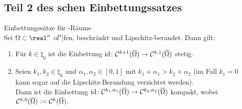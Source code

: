 \subsection{%
    Teil 2 des schen Einbettungssatzes%
}

\begin{Lemma}{Einbettungssätze für -Räume}\\
    Sei $\Omega \subset \real^n$ of"|fen, beschränkt und Lipschitz-berandet.
    Dann gilt:
    \begin{enumerate}
        \item
        Für $k \in \natural_0$ ist die Einbettung
        $\text{id}\colon \mathcal{C}^{k+1}(\overline{\Omega}) \to \mathcal{C}^{k,1}(\overline{\Omega})$ stetig.
        
        \item
        Seien $k_1, k_2 \in \natural_0$ und $\alpha_1, \alpha_2 \in [0, 1]$ mit
        $k_1 + \alpha_1 > k_2 + \alpha_2$
        (im Fall $k_1 = 0$ kann sogar auf die Lipschitz-Berandung verzichtet werden).\\
        Dann ist die Einbettung $\text{id}\colon \mathcal{C}^{k_1,\alpha_1}(\overline{\Omega}) \to
        \mathcal{C}^{k_2,\alpha_2}(\overline{\Omega})$ kompakt,
        wobei $\mathcal{C}^{k,0}(\overline{\Omega}) := \mathcal{C}^k(\overline{\Omega})$.
    \end{enumerate}
\end{Lemma}


